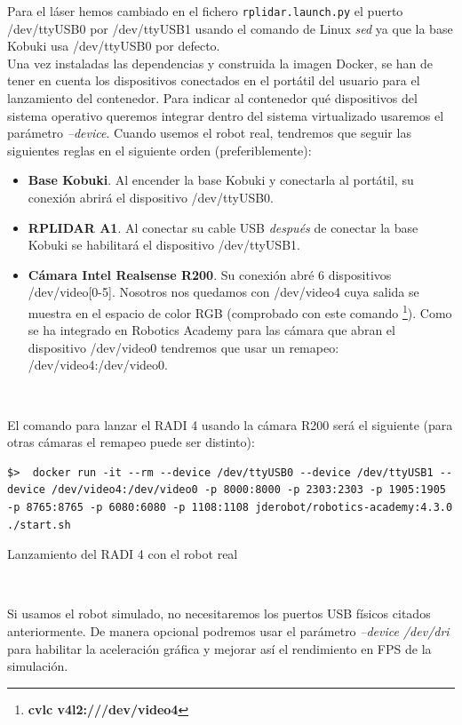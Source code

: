 Para el láser hemos cambiado en el fichero \texttt{rplidar.launch.py} el puerto /dev/ttyUSB0 por /dev/ttyUSB1 usando el comando de Linux \textit{sed} ya que la base Kobuki usa /dev/ttyUSB0 por defecto.\\

Una vez instaladas las dependencias y construida la imagen Docker, se han de tener en cuenta los dispositivos conectados en el portátil del usuario para el lanzamiento del contenedor. Para indicar al contenedor qué dispositivos del sistema operativo queremos integrar dentro del sistema virtualizado usaremos el parámetro \textit{--device}. Cuando usemos el robot real, tendremos que seguir las siguientes reglas en el siguiente orden (preferiblemente):\\

\begin{itemize}
	\item \textbf{Base Kobuki}. Al encender la base Kobuki y conectarla al portátil, su conexión abrirá el dispositivo /dev/ttyUSB0.
	\item \textbf{RPLIDAR A1}. Al conectar su cable USB \textit{después} de conectar la base Kobuki se habilitará el dispositivo /dev/ttyUSB1.
	\item \textbf{Cámara Intel Realsense R200}. Su conexión abré 6 dispositivos /dev/video[0-5]. Nosotros nos quedamos con /dev/video4 cuya salida se muestra en el espacio de color RGB (comprobado con este comando \footnote{\textbf{cvlc v4l2:///dev/video4}}). Como se ha integrado en Robotics Academy para las cámara que abran el dispositivo /dev/video0 tendremos que usar un remapeo: /dev/video4:/dev/video0.
\end{itemize}\

El comando para lanzar el RADI 4 usando la cámara R200 será el siguiente (para otras cámaras el remapeo puede ser distinto):\\

\begin{code}[H]
\begin{lstlisting}
$>  docker run -it --rm --device /dev/ttyUSB0 --device /dev/ttyUSB1 --device /dev/video4:/dev/video0 -p 8000:8000 -p 2303:2303 -p 1905:1905 -p 8765:8765 -p 6080:6080 -p 1108:1108 jderobot/robotics-academy:4.3.0 ./start.sh
\end{lstlisting}
\caption{Lanzamiento del RADI 4 con el robot real}
\label{cod:lanzamiento_radi_robot_real}
\end{code}\

Si usamos el robot simulado, no necesitaremos los puertos USB físicos citados anteriormente. De manera opcional podremos usar el parámetro \textit{--device /dev/dri} para habilitar la aceleración gráfica y mejorar así el rendimiento en FPS de la simulación.\\

